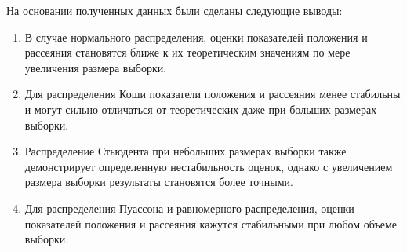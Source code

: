 \documentclass[12pt,a4paper]{article}
\begin{document}
	На основании полученных данных были сделаны следующие выводы:

	\begin{enumerate}
		\item В случае нормального распределения, оценки показателей положения и рассеяния становятся ближе к их теоретическим значениям по мере увеличения размера выборки.
		\item Для распределения Коши показатели положения и рассеяния менее стабильны и могут сильно отличаться от теоретических даже при больших размерах выборки.
		\item Распределение Стьюдента при небольших размерах выборки также демонстрирует определенную нестабильность оценок, однако с увеличением размера выборки результаты становятся более точными.
		\item Для распределения Пуассона и равномерного распределения, оценки показателей положения и рассеяния кажутся стабильными при любом объеме выборки. \\
	\end{enumerate}
\end{document}
